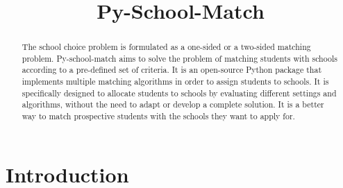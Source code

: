 \documentclass[twocolumn]{bmcart}
\begin{document}
	
	\begin{frontmatter}
		
		\begin{fmbox}
			
			
			\title{Py-School-Match}
			
			
			\author[
			addressref={aff1},
			email={aksran@mun.ca}
			]{ }
			
			
			
			\address[id=aff1]{%
				}
			
			\begin{abstractbox}
				
				\begin{abstract} %
					The school choice problem is formulated as a one-sided or a two-sided matching problem. Py-school-match aims to solve the problem of matching students with schools according to a pre-defined set of criteria. It is an open-source Python package that implements multiple matching algorithms in order to assign students to schools.  It is specifically designed to allocate students to schools by evaluating different settings and algorithms, without the need to adapt or develop a complete solution. It is a better way to match prospective students with the schools they want to apply for.
					
				\end{abstract}
				
				\begin{keyword}
				\end{keyword}
				
				
			\end{abstractbox}
		\end{fmbox}%
		
	\end{frontmatter}
	
	
	\section*{Introduction}
	\vspace{\baselineskip}
	
\end{document}
